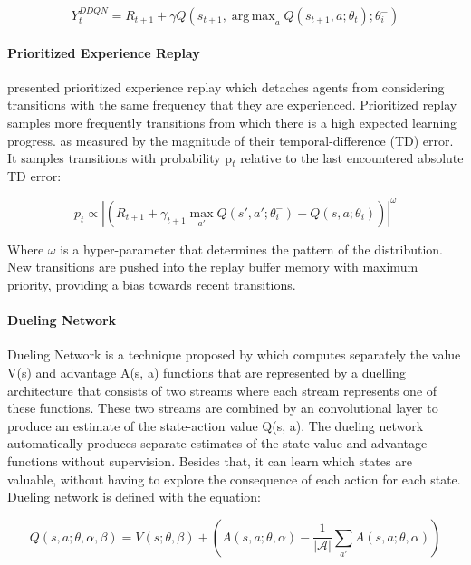 \documentclass{llncs}
\DeclareMathOperator*{\argmax}{arg\,max}
\begin{document}
\begin{equation}
Y_{t}^{DDQN} = R_{t+1} + \gamma Q(s_{t+1}, \argmax_{a} Q(s_{t+1}, a;\theta_{t});\theta_{i}^{-})
\end{equation}

\paragraph{\textbf{Prioritized Experience Replay}}

\cite{SchaulQAS15} presented prioritized experience replay which detaches agents from considering transitions with the same frequency that they are experienced. Prioritized replay samples more frequently transitions from which there is a high expected learning progress. as measured by the magnitude of their temporal-difference (TD) error. It samples transitions with probability p$_{t}$ relative to the last encountered absolute TD error:
	
\begin{equation}
p_{t} \propto \left|\left(R_{t+1} + \gamma_{t+1} \max_{a'}Q\left(s',a';\theta_{i}^{-}\right) - Q\left(s,a;\theta_{i}\right)\right)\right|^{\omega}
\end{equation}

Where $\omega$ is a hyper-parameter that determines the pattern of the distribution. New transitions are pushed into the replay buffer memory with maximum priority, providing a bias towards recent transitions.

\paragraph{\textbf{Dueling Network}}\label{duelingNet}

Dueling Network is a technique proposed by \cite{Wang2016} which computes separately the value V(s) and advantage A(s, a) functions that are represented by a duelling architecture that consists of two streams where each stream represents one of these functions. These two streams are combined by an convolutional layer to produce an estimate of the state-action value Q(s, a). The dueling network automatically produces separate estimates of the state value and advantage functions without supervision. Besides that, it can learn which states are valuable, without having to explore the consequence of each action for each state. Dueling network is defined with the equation:

\begin{equation} \label{eq:dueling eq}
Q(s,a;\theta,\alpha,\beta) = V(s;\theta,\beta) + \left( A\left(s,a;\theta,\alpha \right) - \frac{1}{|\mathcal{A}|} \displaystyle\sum_{a'} A\left(s,a;\theta,\alpha \right) \right) 
\end{equation}
	
\end{document}
